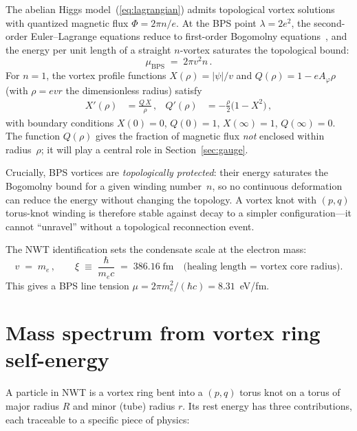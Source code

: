 \documentclass[11pt]{article}
\begin{document}
The abelian Higgs model~(\ref{eq:lagrangian}) admits topological vortex
solutions with quantized magnetic flux $\Phi = 2\pi n/e$.  At the BPS
point $\lambda = 2e^2$, the second-order Euler--Lagrange equations reduce
to first-order Bogomolny equations~\cite{Bogomolny1976}, and the energy
per unit length of a straight $n$-vortex saturates the topological bound:
\begin{equation}
\label{eq:bps_tension}
\mu_\text{BPS} \;=\; 2\pi v^2 n\,.
\end{equation}
For $n=1$, the vortex profile functions $X(\rho) = |\psi|/v$ and
$Q(\rho) = 1 - eA_\varphi\rho$ (with $\rho = evr$ the dimensionless
radius) satisfy
\begin{align}
X'(\rho) &= \frac{Q\,X}{\rho}\,, &
Q'(\rho) &= -\frac{\rho}{2}\bigl(1-X^2\bigr)\,,
\label{eq:bogomolny}
\end{align}
with boundary conditions $X(0) = 0$, $Q(0) = 1$, $X(\infty) = 1$,
$Q(\infty) = 0$.  The function $Q(\rho)$ gives the fraction of
magnetic flux \emph{not} enclosed within radius~$\rho$; it will play
a central role in Section~\ref{sec:gauge}.

Crucially, BPS vortices are \emph{topologically protected}: their
energy saturates the Bogomolny bound for a given winding number~$n$,
so no continuous deformation can reduce the energy without changing
the topology.  A vortex knot with $(p,q)$ torus-knot winding is
therefore stable against decay to a simpler configuration---it
cannot ``unravel'' without a topological reconnection event.

The NWT identification sets the condensate scale at the electron mass:
\begin{equation}
v \;=\; m_e\,, \qquad
\xi \;\equiv\; \frac{\hbar}{m_e c} \;=\; 386.16\;\text{fm}
\quad\text{(healing length = vortex core radius).}
\end{equation}
This gives a BPS line tension $\mu = 2\pi m_e^2/(\hbar c) = 8.31$~eV/fm.


\section{Mass spectrum from vortex ring self-energy}
\label{sec:masses}

A particle in NWT is a vortex ring bent into a $(p,q)$ torus knot on
a torus of major radius $R$ and minor (tube) radius $r$.  Its rest
energy has three contributions, each traceable to a specific piece of
physics:
\end{document}

